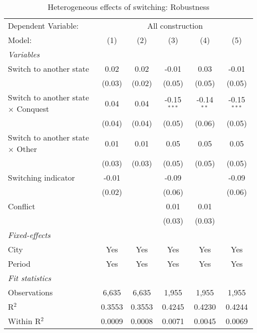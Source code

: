 \begin{table}[htbp]
   \caption{\label{tab:controls_50y} Heterogeneous effects of switching: Robustness}
   \centering
   \begin{tabular}{lccccc}
      \tabularnewline \midrule \midrule
      Dependent Variable: & \multicolumn{5}{c}{All construction}\\
      Model:                                     & (1)    & (2)    & (3)           & (4)          & (5)\\  
      \midrule
      \emph{Variables}\\
      Switch to another state                    & 0.02   & 0.02   & -0.01         & 0.03         & -0.01\\   
                                                 & (0.03) & (0.02) & (0.05)        & (0.05)       & (0.05)\\   
      Switch to another state $\times$ Conquest  & 0.04   & 0.04   & -0.15$^{***}$ & -0.14$^{**}$ & -0.15$^{***}$\\   
                                                 & (0.04) & (0.04) & (0.05)        & (0.06)       & (0.05)\\   
      Switch to another state $\times$ Other     & 0.01   & 0.01   & 0.05          & 0.05         & 0.05\\   
                                                 & (0.03) & (0.03) & (0.05)        & (0.05)       & (0.05)\\   
      Switching indicator                        & -0.01  &        & -0.09         &              & -0.09\\   
                                                 & (0.02) &        & (0.06)        &              & (0.06)\\   
      Conflict                                   &        &        & 0.01          & 0.01         &   \\   
                                                 &        &        & (0.03)        & (0.03)       &   \\   
      \midrule
      \emph{Fixed-effects}\\
      City                                       & Yes    & Yes    & Yes           & Yes          & Yes\\  
      Period                                     & Yes    & Yes    & Yes           & Yes          & Yes\\  
      \midrule
      \emph{Fit statistics}\\
      Observations                               & 6,635  & 6,635  & 1,955         & 1,955        & 1,955\\  
      R$^2$                                      & 0.3553 & 0.3553 & 0.4245        & 0.4230       & 0.4244\\  
      Within R$^2$                               & 0.0009 & 0.0008 & 0.0071        & 0.0045       & 0.0069\\  
      \midrule \midrule
      

\end{tabular}
\end{table}
